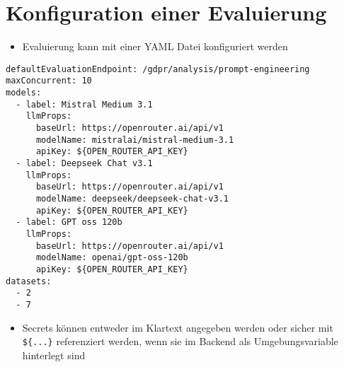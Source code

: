 \section{Konfiguration einer Evaluierung}\label{sec:konfiguration-einer-evaluierung}

\begin{itemize}
    \item Evaluierung kann mit einer YAML Datei konfiguriert werden
\end{itemize}

\begin{verbatim}
defaultEvaluationEndpoint: /gdpr/analysis/prompt-engineering
maxConcurrent: 10
models:
  - label: Mistral Medium 3.1
    llmProps:
      baseUrl: https://openrouter.ai/api/v1
      modelName: mistralai/mistral-medium-3.1
      apiKey: ${OPEN_ROUTER_API_KEY}
  - label: Deepseek Chat v3.1
    llmProps:
      baseUrl: https://openrouter.ai/api/v1
      modelName: deepseek/deepseek-chat-v3.1
      apiKey: ${OPEN_ROUTER_API_KEY}
  - label: GPT oss 120b
    llmProps:
      baseUrl: https://openrouter.ai/api/v1
      modelName: openai/gpt-oss-120b
      apiKey: ${OPEN_ROUTER_API_KEY}
datasets:
  - 2
  - 7
\end{verbatim}

\begin{itemize}
    \item Secrets können entweder im Klartext angegeben werden oder sicher mit \texttt{\$\{...\}} referenziert werden, wenn sie im Backend als Umgebungsvariable hinterlegt sind
\end{itemize}